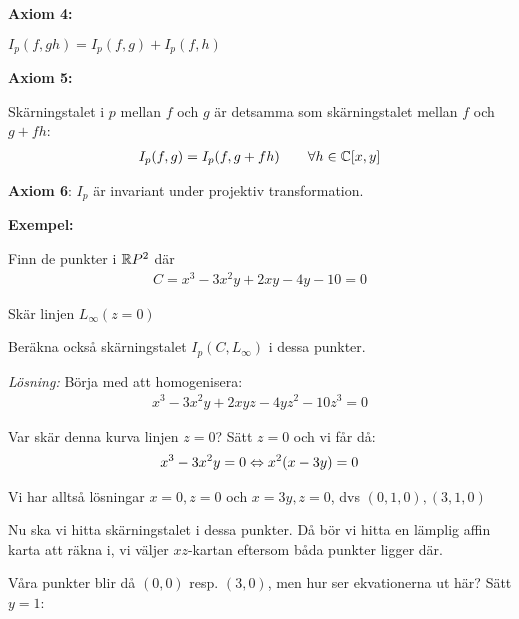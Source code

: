 \par\bigskip
\noindent\textbf{Axiom 4:}\par
\noindent $I_p(f,gh) = I_p(f,g)+I_p(f,h)$ 
\par\bigskip
\noindent\textbf{Axiom 5:}\par
\noindent Skärningstalet i $p$ mellan $f$ och $g$ är detsamma som skärningstalet mellan $f$ och $g+fh$:
\begin{equation*}
  \begin{gathered}
    I_p(f,g) = I_p(f,g+fh)\qquad\forall h\in\mathbb{C}[x,y]
  \end{gathered}
\end{equation*}
\par\bigskip
\noindent\textbf{Axiom 6}: $I_p$ är invariant under projektiv transformation.
\par\bigskip
\noindent\textbf{Exempel:}\par
\noindent Finn de punkter i $\mathbb{R} P^2$ där
\begin{equation*}
  \begin{gathered}
    C=x^3-3x^2y+2xy-4y-10=0
  \end{gathered}
\end{equation*}\par
\noindent Skär linjen $L_\infty (z=0)$\par
\noindent Beräkna också skärningstalet $I_p(C,L_\infty)$ i dessa punkter.
\par\bigskip
\noindent\textit{Lösning:} Börja med att homogenisera:
\begin{equation*}
  \begin{gathered}
    x^3-3x^2y+2xyz-4yz^2-10z^3=0
  \end{gathered}
\end{equation*}\par
\noindent Var skär denna kurva linjen $z=0$? Sätt $z=0$ och vi får då:
\begin{equation*}
  \begin{gathered}
    x^3-3x^2y=0\Leftrightarrow x^2(x-3y)=0
  \end{gathered}
\end{equation*}\par
\noindent Vi har alltså lösningar $x=0, z=0$ och $x=3y, z=0$, dvs $(0,1,0), (3,1,0)$\par
\noindent Nu ska vi hitta skärningstalet i dessa punkter. Då bör vi hitta en lämplig affin karta att räkna i, vi väljer $xz$-kartan eftersom båda punkter ligger där.\par
\noindent Våra punkter blir då $(0,0)$ resp. $(3,0)$, men hur ser ekvationerna ut här? Sätt $y=1$:
